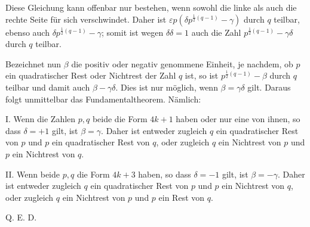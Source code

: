 Diese Gleichung kann offenbar nur bestehen, wenn sowohl die linke als auch die rechte Seite für sich verschwindet. Daher ist $\varepsilon p(\delta p^{\frac12(q-1)}-\gamma)$ durch $q$ teilbar, ebenso auch $\delta p^{\frac12(q-1)}-\gamma$; somit ist wegen $\delta\delta=1$ auch die Zahl $p^{\frac12(q-1)}-\gamma\delta$ durch $q$ teilbar.

Bezeichnet nun $\beta$ die positiv oder negativ genommene Einheit, je nachdem, ob $p$ ein quadratischer Rest oder Nichtrest der Zahl $q$ ist, so ist $p^{\frac12(q-1)}-\beta$ durch $q$ teilbar und damit auch $\beta-\gamma\delta$. Dies ist nur möglich, wenn $\beta=\gamma\delta$ gilt. Daraus folgt unmittelbar das Fundamentaltheorem. Nämlich:

I. Wenn die Zahlen $p,q$ beide die Form $4k+1$ haben oder nur eine von ihnen, so dass $\delta=+1$ gilt, ist $\beta=\gamma$. Daher ist entweder zugleich $q$ ein quadratischer Rest von $p$ und $p$ ein quadratischer Rest von $q$, oder zugleich $q$ ein Nichtrest von $p$ und $p$ ein Nichtrest von $q$.

II. Wenn beide $p,q$ die Form $4k+3$ haben, so dass $\delta=-1$ gilt, ist $\beta=-\gamma$. Daher ist entweder zugleich $q$ ein quadratischer Rest von $p$ und $p$ ein Nichtrest von $q$, oder zugleich $q$ ein Nichtrest von $p$ und $p$ ein Rest von $q$.

Q. E. D.
